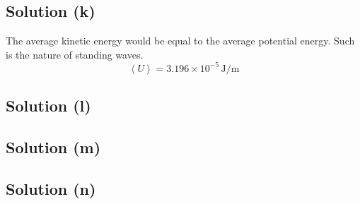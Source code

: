\documentclass[12pt]{article}
\newcommand{\E}[1]{\times 10^{#1}}
\begin{document}
        \subsection{Solution (k)}
            The average kinetic energy would be equal to the average potential energy. 
            Such is the nature of standing waves.
            \begin{equation}
                \left\langle U \right\rangle    =   \boxed{3.196\E{-5}\,\unit{\joule/\meter}}
            \end{equation}

        \subsection{Solution (l)}

        \subsection{Solution (m)}

        \subsection{Solution (n)}
\end{document}
